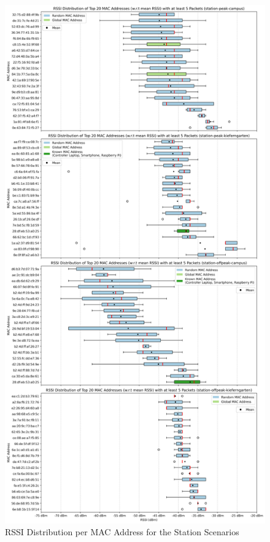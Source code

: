 \documentclass[sigconf,nonacm]{acmart}
\begin{document}
\begin{figure}
    \centering
    \includegraphics[width=\columnwidth]{images/part1/rssi/top-macs-station-scenarios.png}
    \caption{RSSI Distribution per MAC Address for the Station Scenarios}
    \label{fig:station_rssi_distribution_per_mac}
\end{figure}
\end{document}
